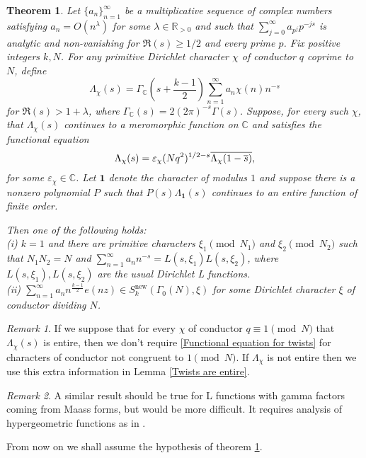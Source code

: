\documentclass[a4paper,12.5pt]{amsart}
\newtheorem{thm}{Theorem}[section]
\theoremstyle{definition}
\theoremstyle{remark}
\newtheorem*{rem}{Remark}
\begin{document}
\begin{thm}
\label{Main thm}
Let $\{a_n \}_{n=1}^{\infty}$ be a multiplicative sequence of complex numbers satisfying $a_n= O(n^{\lambda})$ for some $\lambda \in \mathbb{R}_{>0}$ and such that $\sum_{j=0}^{\infty} a_{p^j} p^{-js} $  is analytic and non-vanishing for $\Re(s) \geq 1/2$ and every prime $p$. Fix positive  integers $k,N$. For any  primitive Dirichlet character $\chi$ of conductor $q$ coprime to $N$, define 
\[  \Lambda_{\chi} (s)= \Gamma_{\mathbb{C}} \left(  s+ \frac{k-1}{2}  \right) \sum_{n=1}^{\infty} a_n  \chi(n) n^{-s}                      \]
for $\Re(s)> 1 + \lambda$, where $\Gamma_{\mathbb{C}} (s) =  2 (2 \pi)^{-s} \Gamma(s)$. Suppose, for every such $\chi$, that $\Lambda_{\chi}(s)$
continues to a meromorphic function on $\mathbb{C}$ and satisfies the functional equation
\begin{equation}{\label{Functional equation for twists}}
     \Lambda_{\chi}(s) = \varepsilon_{\chi} (Nq^2)^{1/2 -s} \overline{ \Lambda_{\chi}  ( 1 - \overline{s} )}          , 
\end{equation}  
for some $\varepsilon_{\chi} \in \mathbb{C}$. Let $\mathbf{1}$ denote the character of modulus $1$ and suppose there is a nonzero polynomial $P$ such that $P(s) \Lambda_{\mathbf{1}} (s)$ continues to an entire function of finite order. 

Then one of the following holds: \\
(i) $k=1$ and there are primitive characters $\xi_1 \pmod{N_1}$ and $\xi_2 \pmod{N_2}$ such that $N_1 N_2 = N$ and $  \sum_{n=1}^{\infty} a_n n^{-s} =  L(s, \xi_1) L(s , \xi_2)$, where $ L(s, \xi_1), L(s, \xi_2)$ are the usual Dirichlet L functions. \\
(ii) $  \sum_{n=1}^{\infty} a_n n^{\frac{k-1}{2}} e(nz)  \in S_k ^{\text{new}} (\Gamma_0 (N) , \xi)$ for some Dirichlet character $\xi$ of conductor  dividing $N$. 
\end{thm}
\begin{rem}
     If we suppose that for every $\chi$ of conductor $q \equiv 1 \pmod{N}$ that $\Lambda_{\chi} (s)$ is entire, then we don't require \eqref{Functional equation for twists} for  characters of conductor not congruent to $1 \pmod{N}$. If $\Lambda_{\chi}$ is not entire then we use this extra information in Lemma \ref{Twists are entire}. 
\end{rem}
\begin{rem}
A similar result should be true for L functions with gamma factors coming from Maass forms, but would be more difficult. It requires analysis of hypergeometric functions as in \cite{neururer2018weil}.
\end{rem}
From now on we shall assume the hypothesis of theorem \ref{Main thm}.
\end{document}
